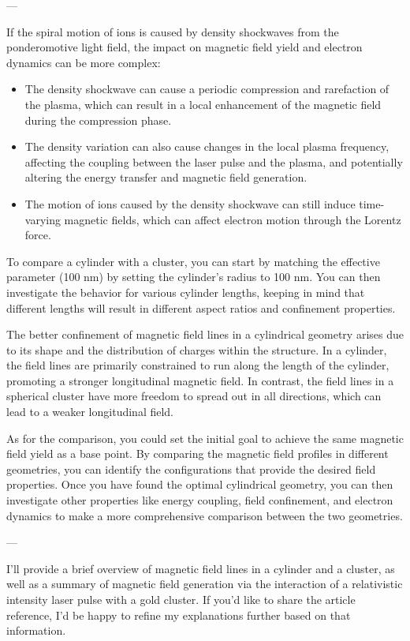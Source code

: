 ---

If the spiral motion of ions is caused by density shockwaves from the ponderomotive light field, the impact on magnetic field yield and electron dynamics can be more complex:

\begin{itemize}
    \item The density shockwave can cause a periodic compression and rarefaction of the plasma, which can result in a local enhancement of the magnetic field during the compression phase.
    \item The density variation can also cause changes in the local plasma frequency, affecting the coupling between the laser pulse and the plasma, and potentially altering the energy transfer and magnetic field generation.
    \item The motion of ions caused by the density shockwave can still induce time-varying magnetic fields, which can affect electron motion through the Lorentz force.
\end{itemize}

To compare a cylinder with a cluster, you can start by matching the effective parameter (100 nm) by setting the cylinder's radius to 100 nm. You can then investigate the behavior for various cylinder lengths, keeping in mind that different lengths will result in different aspect ratios and confinement properties.

The better confinement of magnetic field lines in a cylindrical geometry arises due to its shape and the distribution of charges within the structure. In a cylinder, the field lines are primarily constrained to run along the length of the cylinder, promoting a stronger longitudinal magnetic field. In contrast, the field lines in a spherical cluster have more freedom to spread out in all directions, which can lead to a weaker longitudinal field.

As for the comparison, you could set the initial goal to achieve the same magnetic field yield as a base point. By comparing the magnetic field profiles in different geometries, you can identify the configurations that provide the desired field properties. Once you have found the optimal cylindrical geometry, you can then investigate other properties like energy coupling, field confinement, and electron dynamics to make a more comprehensive comparison between the two geometries.

---

I'll provide a brief overview of magnetic field lines in a cylinder and a cluster, as well as a summary of magnetic field generation via the interaction of a relativistic intensity laser pulse with a gold cluster. If you'd like to share the article reference, I'd be happy to refine my explanations further based on that information.


